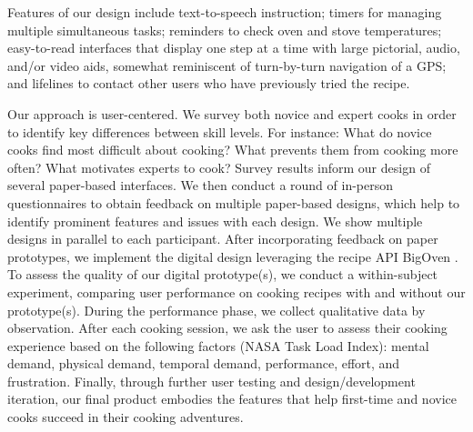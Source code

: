 \documentclass{sigchi}
\begin{document}
Features of our design include text-to-speech instruction; timers for managing multiple simultaneous tasks; reminders to check oven and stove temperatures; easy-to-read interfaces that display one step at a time with large pictorial, audio, and/or video aids, somewhat reminiscent of turn-by-turn navigation of a GPS; and lifelines to contact other users who have previously tried the recipe.

Our approach is user-centered. We survey both novice and expert cooks in order to identify key differences between skill levels. For instance: What do novice cooks find most difficult about cooking? What prevents them from cooking more often? What motivates experts to cook? Survey results inform our design of several paper-based interfaces. We then conduct a round of in-person questionnaires to obtain feedback on multiple paper-based designs, which help to identify prominent features and issues with each design. We show multiple designs in parallel to each participant. After incorporating feedback on paper prototypes, we implement the digital design leveraging the recipe API BigOven \cite{api_oven}. To assess the quality of our digital prototype(s), we conduct a within-subject experiment, comparing user performance on cooking recipes with and without our prototype(s). During the performance phase, we collect qualitative data by observation. After each cooking session, we ask the user to assess their cooking experience based on the following factors (NASA Task Load Index): mental demand, physical demand, temporal demand, performance, effort, and frustration. Finally, through further user testing and design/development iteration, our final product embodies the features that help first-time and novice cooks succeed in their cooking adventures.
\end{document}
